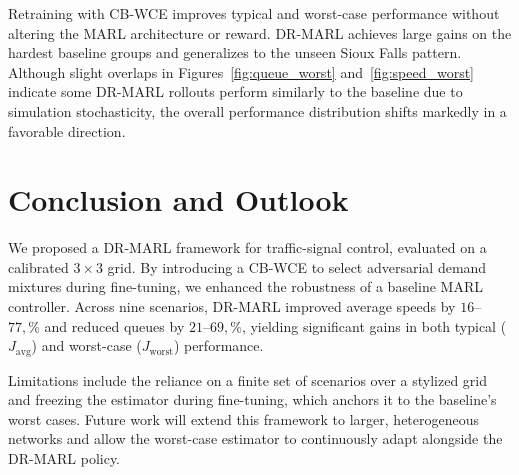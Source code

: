\documentclass{ifacconf}
\newcommand{\1}{\mbox{1}\hspace{-0.25em}\mbox{l}}
\begin{document}
Retraining with CB-WCE improves typical and worst-case performance without altering the MARL architecture or reward. DR-MARL achieves large gains on the hardest baseline groups and generalizes to the unseen Sioux Falls pattern. Although slight overlaps in Figures~\ref{fig:queue_worst} and~\ref{fig:speed_worst} indicate some DR-MARL rollouts perform similarly to the baseline due to simulation stochasticity, the overall performance distribution shifts markedly in a favorable direction.

\section{Conclusion and Outlook}
\label{sec:conclusion}

We proposed a DR-MARL framework for traffic-signal control, evaluated on a calibrated $3\times3$ grid. By introducing a CB-WCE to select adversarial demand mixtures during fine-tuning, we enhanced the robustness of a baseline MARL controller. Across nine scenarios, DR-MARL improved average speeds by $16$–$77,\%$ and reduced queues by $21$–$69,\%$, yielding significant gains in both typical ($J_{\mathrm{avg}}$) and worst-case ($J_{\mathrm{worst}}$) performance.

Limitations include the reliance on a finite set of scenarios over a stylized grid and freezing the estimator during fine-tuning, which anchors it to the baseline's worst cases. Future work will extend this framework to larger, heterogeneous networks and allow the worst-case estimator to continuously adapt alongside the DR-MARL policy.
\footnotesize
\balance 

\end{document}
